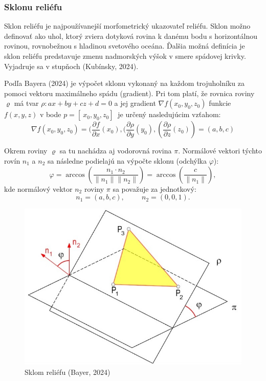 \documentclass[12pt]{article}
\begin{document}
\subsubsection*{Sklonu reliéfu}
Sklon reliéfu je najpoužívanejší morfometrický ukazovateľ reliéfu. Sklon  možno definovať ako uhol, ktorý zviera dotyková rovina k danému bodu s horizontálnou rovinou, rovnobežnou s hladinou svetového oceána. Ďalšia možná definícia je  sklon reliéfu predstavuje zmenu nadmorských výšok v smere spádovej krivky. Vyjadruje sa v stupňoch (Kubínsky, 2024). \par
Podľa Bayera (2024) je výpočet sklonu vykonaný na každom trojuholníku za pomoci vektoru maximálneho spádu (gradient). Pri tom platí, že rovnica  roviny $\varrho$ má tvar $\rho : ax + by + cz + d = 0$ a jej gradient  $\nabla f(x_0, y_0, z_0)$ funkcie $f(x, y, z) $ v bode $ p = [ \ x_0, y_0, z_0]\ $ je určený nasledujúcim vzťahom: $$\nabla f (x_0, y_0, z_0) = (\frac{\partial f }{ \partial x}(x_0), (\frac{\partial \rho }{ \partial y}(y_0),(\frac{\partial \rho }{ \partial z}(z_0))= (a, b, c)$$\par
Okrem roviny $\varrho$ sa tu nachádza aj vodorovná rovina $\pi$. Normálové vektori týchto rovín $n_1$ a $n_2$ sa následne podielajú na výpočte sklonu (odchýlka $\varphi$): $$
\varphi = \arccos \left( \frac{n_1 \cdot n_2}{\lVert n_1 \rVert \lVert n_2 \rVert} \right) = \arccos \left( \frac{c}{\lVert n_1 \rVert} \right),
$$
kde normálový vektor $n_2$ roviny $\pi$ sa považuje za jednotkový:
$$ n_1 = (a, b, c),\hspace{1cm} n_2 = (0, 0, 1).$$
\begin{figure}[h]
    \centering
    \includegraphics[width=0.8\linewidth]{latex/images/sklon.jpg}
    \caption{Sklom reliéfu (Bayer, 2024)}
    \label{fig:enter-label}
\end{figure}
\newpage
\end{document}
